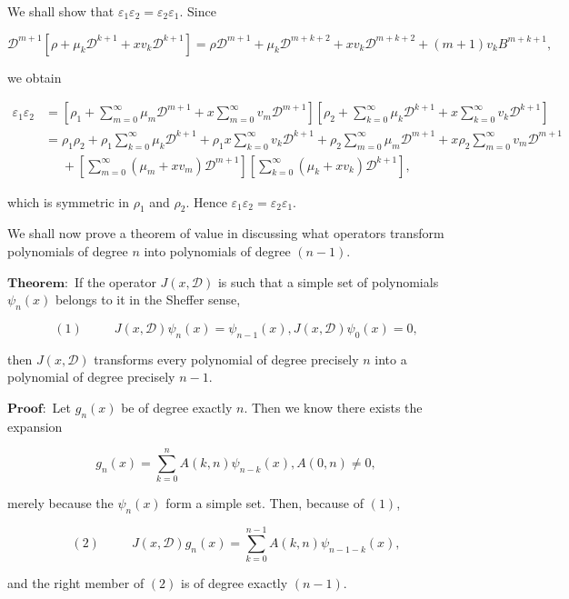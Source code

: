 \begin{solution}
We shall show that $\varepsilon_1 \varepsilon_2 = \varepsilon_2 \varepsilon_1.$ Since 

$$\mathscr{D}^{m+1}[\rho + \mu_k \mathscr{D}^{k+1} + x v_k \mathscr{D}^{k+1}] = \rho \mathscr{D}^{m+1} + \mu_k \mathscr{D}^{m+k+2} + x v_k \mathscr{D}^{m+k+2} + (m+1) v_k B^{m+k+1},$$

we obtain

$$\begin{array}{ll}
\varepsilon_1 \varepsilon_2 &= \left[ \rho_1 + \displaystyle\sum_{m=0}^{\infty} \mu_m \mathscr{D}^{m+1} + x \displaystyle\sum_{m=0}^{\infty} v_m \mathscr{D}^{m+1} \right] \left[ \rho_2 + \displaystyle\sum_{k=0}^{\infty} \mu_k \mathscr{D}^{k+1} + x \displaystyle\sum_{k=0}^{\infty} v_k \mathscr{D}^{k+1} \right] \\
&= \rho_1 \rho_2 + \rho_1 \displaystyle\sum_{k=0}^{\infty} \mu_k \mathscr{D}^{k+1} + \rho_1 x \displaystyle\sum_{k=0}^{\infty} v_k \mathscr{D}^{k+1} + \rho_2 \displaystyle\sum_{m=0}^{\infty} \mu_m \mathscr{D}^{m+1} + x \rho_2 \displaystyle\sum_{m=0}^{\infty} v_m \mathscr{D}^{m+1} \\
&\phantom{=}+ \left[ \displaystyle\sum_{m=0}^{\infty} (\mu_m + x v_m) \mathscr{D}^{m+1} \right] \left[ \displaystyle\sum_{k=0}^{\infty} (\mu_k + x v_k) \mathscr{D}^{k+1} \right],
\end{array}$$

which is symmetric in $\rho_1$ and $\rho_2$. Hence $\varepsilon_1 \varepsilon_2 = \varepsilon_2 \varepsilon_1.$

We shall now prove a theorem of value in discussing what operators transform polynomials of degree $n$ into polynomials of degree $(n-1)$.

$\mathbf{Theorem:}$ If the operator $J(x, \mathscr{D})$ is such that a simple set of polynomials $\psi_n(x)$ belongs to it in the Sheffer sense,

$$(1) \hspace{30pt} J(x,\mathscr{D}) \psi_n(x) = \psi_{n-1}(x), J(x,\mathscr{D}) \psi_0(x) = 0,$$

then $J(x ,\mathscr{D})$ transforms every polynomial of degree precisely $n$ into a polynomial of degree precisely $n-1$.

$\mathbf{Proof:}$ Let $g_n(x)$ be of degree exactly $n$. Then we know there exists the expansion

$$g_n(x)=\displaystyle\sum_{k=0}^n A(k,n) \psi_{n-k}(x), A(0,n) \neq 0,$$

merely because the $\psi_n(x)$ form a simple set. Then, because of $(1)$,

$$(2) \hspace{30pt} J(x,\mathscr{D}) g_n(x) = \displaystyle\sum_{k=0}^{n-1} A(k,n) \psi_{n-1-k}(x),$$

and the right member of $(2)$ is of degree exactly $(n-1).$

\end{solution}
